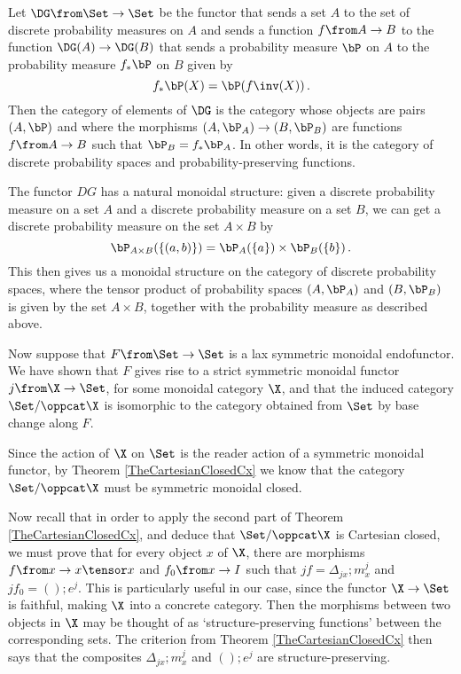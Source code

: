 \begin{example}
  Let $\DG \from \Set \to \Set$ be the functor that sends a set $A$ to the set of discrete probability measures on $A$ and sends a function $f\from A \to B$ to the function $\DG(A) \to \DG(B)$ that sends a probability measure $\bP$ on $A$ to the probability measure $f_*\bP$ on $B$ given by
  \[
    f_*\bP(X) = \bP(f\inv(X))\,.
    \]
  Then the category of elements of $\DG$ is the category whose objects are pairs $(A,\bP)$ and where the morphisms $(A,\bP_A) \to (B,\bP_B)$ are functions $f\from A \to B$ such that $\bP_B=f_*\bP_A$.  
  In other words, it is the category of discrete probability spaces and probability-preserving functions.

  The functor $DG$ has a natural monoidal structure: given a discrete probability measure on a set $A$ and a discrete probability measure on a set $B$, we can get a discrete probability measure on the set $A \times B$ by
  \[
    \bP_{A\times B}(\{(a,b)\}) = \bP_A(\{a\})\times\bP_B(\{b\})\,.
    \]
  This then gives us a monoidal structure on the category of discrete probability spaces, where the tensor product of probability spaces $(A,\bP_A)$ and $(B,\bP_B)$ is given by the set $A \times B$, together with the probability measure as described above.
\end{example}

Now suppose that $F\from \Set \to \Set$ is a lax symmetric monoidal endofunctor.  
We have shown that $F$ gives rise to a strict symmetric monoidal functor $j\from \X \to \Set$, for some monoidal category $\X$, and that the induced category $\Set/\oppcat\X$ is isomorphic to the category obtained from $\Set$ by base change along $F$.  

Since the action of $\X$ on $\Set$ is the reader action of a symmetric monoidal functor, by Theorem \ref{TheCartesianClosedCx} we know that the category $\Set/\oppcat\X$ must be symmetric monoidal closed.  

Now recall that in order to apply the second part of Theorem \ref{TheCartesianClosedCx}, and deduce that $\Set/\oppcat\X$ is Cartesian closed, we must prove that for every object $x$ of $\X$, there are morphisms $f \from x \to x \tensor x$ and $f_0 \from x \to I$ such that $jf = \Delta_{jx};m^j_x$ and $jf_0 = ();e^j$.
This is particularly useful in our case, since the functor $\X \to \Set$ is faithful, making $\X$ into a concrete category.  
Then the morphisms between two objects in $\X$ may be thought of as `structure-preserving functions' between the corresponding sets.  
The criterion from Theorem \ref{TheCartesianClosedCx} then says that the composites $\Delta_{jx};m^j_x$ and $();e^j$ are structure-preserving.

